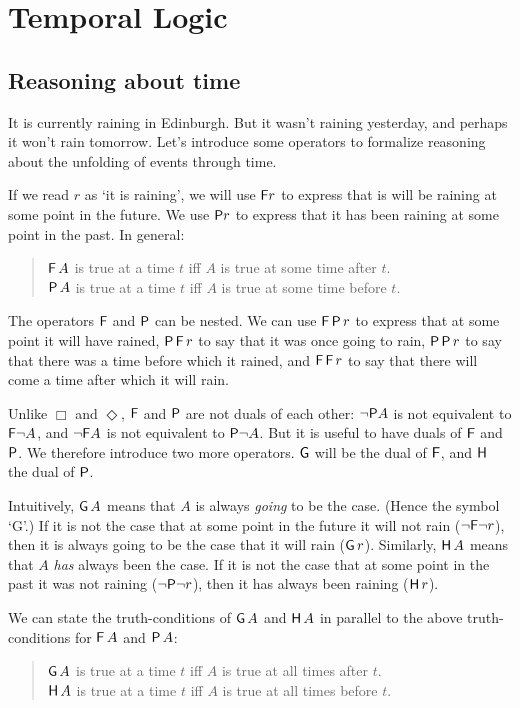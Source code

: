 \chapter{Temporal Logic}\label{ch:time}

\section{Reasoning about time}\label{sec:time-intro}

It is currently raining in Edinburgh. But it wasn't raining yesterday, and
perhaps it won't rain tomorrow. Let's introduce some operators to formalize
reasoning about the unfolding of events through time.

If we read $r$ as `it is raining', we will use $\operatorname{\mathsf{F}}\! r$ to express that is will be
raining at some point in the future. We use $\operatorname{\mathsf{P}}\! r$ to express that it has been
raining at some point in the past. In general:
%
\begin{quote}
  $\operatorname{\mathsf{F}} A$ is true at a time $t$ iff $A$ is true at some time after $t$.\\
  $\operatorname{\mathsf{P}} A$ is true at a time $t$ iff $A$ is true at some time before $t$.
\end{quote}

The operators $\operatorname{\mathsf{F}}$ and $\operatorname{\mathsf{P}}$ can be nested. We can use $\operatorname{\mathsf{F}} \operatorname{\mathsf{P}} r$ to express
that at some point it will have rained, $\operatorname{\mathsf{P}}\operatorname{\mathsf{F}} r$ to say that it was once going
to rain, $\operatorname{\mathsf{P}}\operatorname{\mathsf{P}} r$ to say that there was a time before which it rained, and
$\operatorname{\mathsf{F}}\operatorname{\mathsf{F}} r$ to say that there will come a time after which it will rain.

Unlike $\Box$ and $\Diamond$, $\operatorname{\mathsf{F}}$ and $\operatorname{\mathsf{P}}$ are not duals of each other:
$\neg \!\operatorname{\mathsf{P}}\! A$ is not equivalent to $\operatorname{\mathsf{F}} \!\neg A$, and $\neg \!\operatorname{\mathsf{F}}\! A$ is not
equivalent to $\operatorname{\mathsf{P}} \!\neg A$. But it is useful to have duals of $\operatorname{\mathsf{F}}$ and $\operatorname{\mathsf{P}}$.
We therefore introduce two more operators. $\operatorname{\mathsf{G}}$ will be the dual of $\operatorname{\mathsf{F}}$, and
$\operatorname{\mathsf{H}}$ the dual of $\operatorname{\mathsf{P}}$.

Intuitively, $\operatorname{\mathsf{G}} A$ means that $A$ is always \emph{going} to be the case.
(Hence the symbol `G'.) If it is not the case that at some point in the future
it will not rain ($\neg \!\operatorname{\mathsf{F}}\! \neg r$), then it is always going to be the case
that it will rain ($\operatorname{\mathsf{G}} r$). Similarly, $\operatorname{\mathsf{H}} A$ means that $A$ \emph{has} always
been the case. If it is not the case that at some point in the past it was not
raining ($\neg \!\operatorname{\mathsf{P}}\! \neg r$), then it has always been raining ($\operatorname{\mathsf{H}} r$).

We can state the truth-conditions of $\operatorname{\mathsf{G}} A$ and $\operatorname{\mathsf{H}} A$ in parallel to the
above truth-conditions for $\operatorname{\mathsf{F}} A$ and $\operatorname{\mathsf{P}} A$:
\begin{quote}
  $\operatorname{\mathsf{G}} A$ is true at a time $t$ iff $A$ is true at all times after $t$.\\
  $\operatorname{\mathsf{H}} A$ is true at a time $t$ iff $A$ is true at all times before $t$.
\end{quote}

